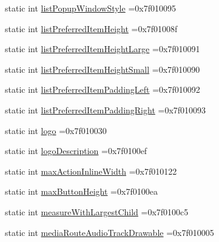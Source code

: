 \begin{DoxyCompactItemize}
static int \hyperlink{classandroid_1_1support_1_1graphics_1_1drawable_1_1animated_1_1R_1_1attr_a667983b0f0ddd9782d3690e128ef95cb}{list\+Popup\+Window\+Style} =0x7f010095
\item 
static int \hyperlink{classandroid_1_1support_1_1graphics_1_1drawable_1_1animated_1_1R_1_1attr_a28c716f1f116d81ceabfe64b46fb8996}{list\+Preferred\+Item\+Height} =0x7f01008f
\item 
static int \hyperlink{classandroid_1_1support_1_1graphics_1_1drawable_1_1animated_1_1R_1_1attr_acdb051311879bb9f761285da0df09ec1}{list\+Preferred\+Item\+Height\+Large} =0x7f010091
\item 
static int \hyperlink{classandroid_1_1support_1_1graphics_1_1drawable_1_1animated_1_1R_1_1attr_a467936cc6be80ab5c2feae34d5062e49}{list\+Preferred\+Item\+Height\+Small} =0x7f010090
\item 
static int \hyperlink{classandroid_1_1support_1_1graphics_1_1drawable_1_1animated_1_1R_1_1attr_ac6359766bbb1bcbe65d08460099364fc}{list\+Preferred\+Item\+Padding\+Left} =0x7f010092
\item 
static int \hyperlink{classandroid_1_1support_1_1graphics_1_1drawable_1_1animated_1_1R_1_1attr_a2bf904598c883dfdb29e7bd825fd7401}{list\+Preferred\+Item\+Padding\+Right} =0x7f010093
\item 
static int \hyperlink{classandroid_1_1support_1_1graphics_1_1drawable_1_1animated_1_1R_1_1attr_a4f2062682a763eae64d46b8b2a2484b9}{logo} =0x7f010030
\item 
static int \hyperlink{classandroid_1_1support_1_1graphics_1_1drawable_1_1animated_1_1R_1_1attr_a04288ffb7ed8c9a7db0d54e0ab79384e}{logo\+Description} =0x7f0100ef
\item 
static int \hyperlink{classandroid_1_1support_1_1graphics_1_1drawable_1_1animated_1_1R_1_1attr_a9ff7c1b839ba259118ab593eeed60580}{max\+Action\+Inline\+Width} =0x7f010122
\item 
static int \hyperlink{classandroid_1_1support_1_1graphics_1_1drawable_1_1animated_1_1R_1_1attr_aae5ab9c6281c13daf9438b37f5f64449}{max\+Button\+Height} =0x7f0100ea
\item 
static int \hyperlink{classandroid_1_1support_1_1graphics_1_1drawable_1_1animated_1_1R_1_1attr_ae640187a6424aea5179356e440b7b871}{measure\+With\+Largest\+Child} =0x7f0100c5
\item 
static int \hyperlink{classandroid_1_1support_1_1graphics_1_1drawable_1_1animated_1_1R_1_1attr_ac65225c73fcaeebef79ea4439efbb801}{media\+Route\+Audio\+Track\+Drawable} =0x7f010005
\item 

\end{DoxyCompactItemize}
